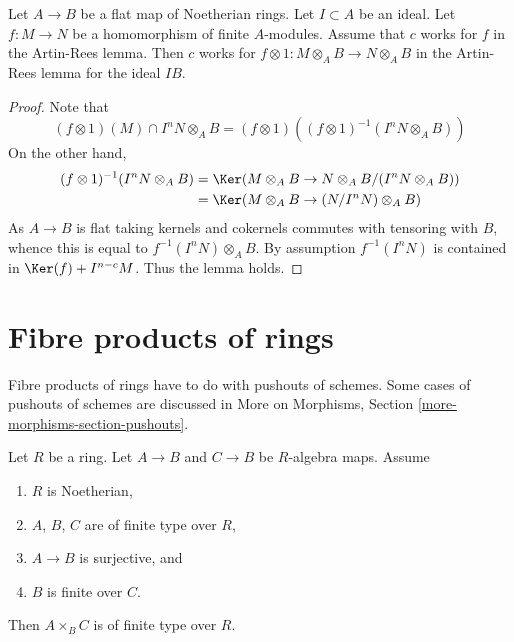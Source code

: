 \begin{lemma}
\label{lemma-works-flat-extension}
Let $A \to B$ be a flat map of Noetherian rings. Let $I \subset A$ be
an ideal. Let $f : M \to N$ be a homomorphism of finite $A$-modules.
Assume that $c$ works for $f$ in the Artin-Rees lemma. Then $c$ works for
$f \otimes 1 : M \otimes_A B \to N \otimes_A B$ in the Artin-Rees lemma
for the ideal $IB$.
\end{lemma}

\begin{proof}
Note that
$$
(f \otimes 1)(M) \cap I^n N \otimes_A B
= (f \otimes 1)\left((f \otimes 1)^{-1}(I^n N \otimes_A B)\right)
$$
On the other hand,
\begin{align*}
(f \otimes 1)^{-1}(I^n N \otimes_A B) &
= \Ker(M \otimes_A B \to N \otimes_A B/(I^n N \otimes_A B)) \\
& =
\Ker(M \otimes_A B \to (N/I^nN) \otimes_A B)
\end{align*}
As $A \to B$ is flat taking kernels and cokernels commutes with
tensoring with $B$, whence this is equal to
$f^{-1}(I^nN) \otimes_A B$. By assumption $f^{-1}(I^nN)$ is contained in
$\Ker(f) + I^{n - c}M$. Thus the lemma holds.
\end{proof}








\section{Fibre products of rings}
\label{section-fibre-products-rings}

\noindent
Fibre products of rings have to do with pushouts of schemes. Some
cases of pushouts of schemes are discussed in
More on Morphisms, Section \ref{more-morphisms-section-pushouts}.

\begin{lemma}
\label{lemma-fibre-product-finite-type}
Let $R$ be a ring. Let $A \to B$ and $C \to B$ be $R$-algebra maps.
Assume
\begin{enumerate}
\item $R$ is Noetherian,
\item $A$, $B$, $C$ are of finite type over $R$,
\item $A \to B$ is surjective, and
\item $B$ is finite over $C$.
\end{enumerate}
Then $A \times_B C$ is of finite type over $R$.
\end{lemma}

